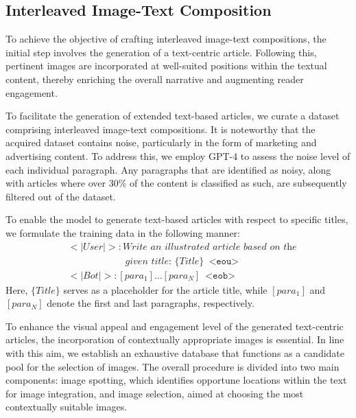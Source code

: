 \documentclass[10pt,twocolumn,letterpaper]{article}
\begin{document}
\subsection{Interleaved Image-Text Composition}
\label{sec:compos_data}
To achieve the objective of crafting interleaved image-text compositions, the initial step involves the generation of a text-centric article. Following this, pertinent images are incorporated at well-suited positions within the textual content, thereby enriching the overall narrative and augmenting reader engagement.

 To facilitate the generation of extended text-based articles, we curate a dataset comprising interleaved image-text compositions. It is noteworthy that the acquired dataset contains noise, particularly in the form of marketing and advertising content. To address this, we employ GPT-4 to assess the noise level of each individual paragraph. Any paragraphs that are identified as noisy, along with articles where over 30\% of the content is classified as such, are subsequently filtered out of the dataset.

To enable the model to generate text-based articles with respect to specific titles, we formulate the training data in the following manner:
\begin{align*}
& <|User|>: \textit{Write an illustrated article based on the} \\
& \quad\quad\quad\quad\quad\quad \textit{given title: \{Title\}} \enspace \texttt{<eou>}  \\
& <|Bot|>: [para_1]\ldots[para_N] \enspace \texttt{<eob>}
\end{align*}
Here, $\{Title\}$ serves as a placeholder for the article title, while $[para_1]$ and $[para_N]$ denote the first and last paragraphs, respectively. 

To enhance the visual appeal and engagement level of the generated text-centric articles, the incorporation of contextually appropriate images is essential. In line with this aim, we establish an exhaustive database that functions as a candidate pool for the selection of images. The overall procedure is divided into two main components: image spotting, which identifies opportune locations within the text for image integration, and image selection, aimed at choosing the most contextually suitable images. 
\end{document}
